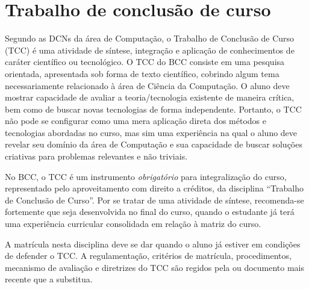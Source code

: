 \section{Trabalho de conclusão de curso}
\label{sec:trabalho_conclusao_curso}

Segundo as DCNs da área de Computação, o Trabalho de Conclusão de Curso (TCC) é
uma atividade de síntese, integração e aplicação de conhecimentos de caráter
científico ou tecnológico. 
O TCC do BCC consiste em uma pesquisa orientada, apresentada sob forma de texto
científico, cobrindo algum tema necessariamente relacionado à área de Ciência
da Computação. 
O aluno deve mostrar capacidade de avaliar a teoria/tecnologia existente de
maneira crítica, bem como de buscar novas tecnologias de forma independente.
Portanto, o TCC não pode se configurar como uma mera aplicação direta dos
métodos e tecnologias abordadas no curso, mas sim uma experiência na qual o
aluno deve revelar seu domínio da área de Computação e sua capacidade de buscar
soluções criativas para problemas relevantes e não triviais.


No BCC, o TCC é um instrumento \textit{obrigatório} para
integralização do curso, representado pelo aproveitamento com direito
a créditos, da disciplina ``Trabalho de Conclusão de Curso''. Por se
tratar de uma atividade de síntese, recomenda-se fortemente que seja
desenvolvida no final do curso, quando o estudante já terá uma
experiência curricular consolidada em relação à matriz do curso.

A matrícula nesta disciplina deve se dar quando o aluno já estiver em
condições de defender o TCC. A regulamentação, critérios de matrícula,
procedimentos, mecanismo de avaliação e diretrizes do TCC são regidos
pela  ou documento mais recente que a
substitua.
